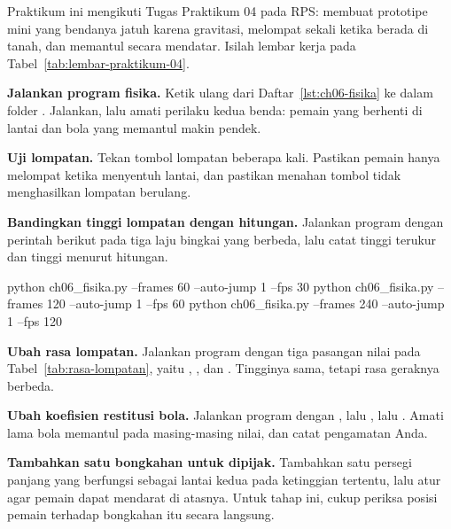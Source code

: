 \begin{praktikumbox}
Praktikum ini mengikuti Tugas Praktikum 04 pada RPS: membuat prototipe
 mini yang bendanya jatuh karena gravitasi, melompat sekali
ketika berada di tanah, dan memantul secara mendatar. Isilah lembar kerja pada
Tabel~\ref{tab:lembar-praktikum-04}.

\begin{langkah}
  \item \textbf{Jalankan program fisika.} Ketik ulang 
        dari Daftar~\ref{lst:ch06-fisika} ke dalam folder .
        Jalankan, lalu amati perilaku kedua benda: pemain yang berhenti di
        lantai dan bola yang memantul makin pendek.

  \item \textbf{Uji lompatan.} Tekan tombol lompatan beberapa kali. Pastikan
        pemain hanya melompat ketika menyentuh lantai, dan pastikan menahan
        tombol tidak menghasilkan lompatan berulang.

  \item \textbf{Bandingkan tinggi lompatan dengan hitungan.} Jalankan program
        dengan perintah berikut pada tiga laju bingkai yang berbeda, lalu catat
        tinggi terukur dan tinggi menurut hitungan.
\begin{kodekeluaran}
python ch06_fisika.py --frames 60 --auto-jump 1 --fps 30
python ch06_fisika.py --frames 120 --auto-jump 1 --fps 60
python ch06_fisika.py --frames 240 --auto-jump 1 --fps 120
\end{kodekeluaran}

  \item \textbf{Ubah rasa lompatan.} Jalankan program dengan tiga pasangan
        nilai pada Tabel~\ref{tab:rasa-lompatan}, yaitu
        ,
        , dan
        . Tingginya sama,
        tetapi rasa geraknya berbeda.

  \item \textbf{Ubah koefisien restitusi bola.} Jalankan program dengan
        , lalu , lalu
        . Amati lama bola memantul pada masing-masing
        nilai, dan catat pengamatan Anda.

  \item \textbf{Tambahkan satu bongkahan untuk dipijak.} Tambahkan satu persegi
        panjang yang berfungsi sebagai lantai kedua pada ketinggian tertentu,
        lalu atur agar pemain dapat mendarat di atasnya. Untuk tahap ini,
        cukup periksa posisi pemain terhadap bongkahan itu secara langsung.


\end{langkah}
\end{praktikumbox}

